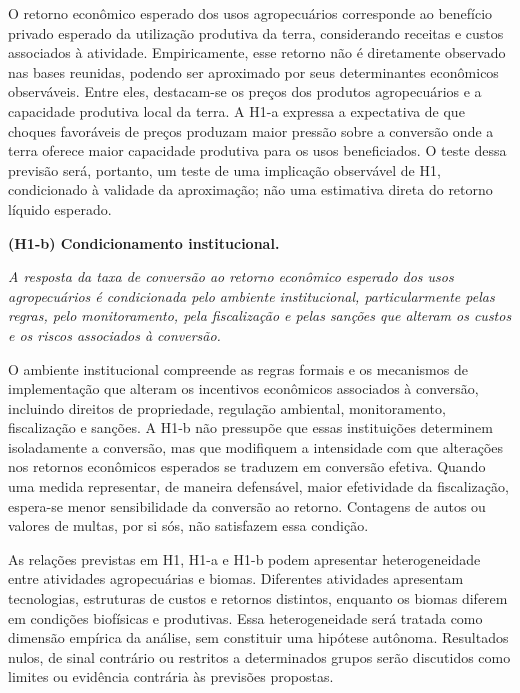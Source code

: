 O retorno econômico esperado dos usos agropecuários corresponde ao benefício privado esperado da utilização produtiva da terra, considerando receitas e custos associados à atividade. Empiricamente, esse retorno não é diretamente observado nas bases reunidas, podendo ser aproximado por seus determinantes econômicos observáveis. Entre eles, destacam-se os preços dos produtos agropecuários e a capacidade produtiva local da terra. A H1-a expressa a expectativa de que choques favoráveis de preços produzam maior pressão sobre a conversão onde a terra oferece maior capacidade produtiva para os usos beneficiados. O teste dessa previsão será, portanto, um teste de uma implicação observável de H1, condicionado à validade da aproximação; não uma estimativa direta do retorno líquido esperado.

\medskip
\noindent\textbf{(H1-b) Condicionamento institucional.}

\noindent\emph{A resposta da taxa de conversão ao retorno econômico esperado dos usos agropecuários é condicionada pelo ambiente institucional, particularmente pelas regras, pelo monitoramento, pela fiscalização e pelas sanções que alteram os custos e os riscos associados à conversão.}

O ambiente institucional compreende as regras formais e os mecanismos de implementação que alteram os incentivos econômicos associados à conversão, incluindo direitos de propriedade, regulação ambiental, monitoramento, fiscalização e sanções. A H1-b não pressupõe que essas instituições determinem isoladamente a conversão, mas que modifiquem a intensidade com que alterações nos retornos econômicos esperados se traduzem em conversão efetiva. Quando uma medida representar, de maneira defensável, maior efetividade da fiscalização, espera-se menor sensibilidade da conversão ao retorno. Contagens de autos ou valores de multas, por si sós, não satisfazem essa condição.

As relações previstas em H1, H1-a e H1-b podem apresentar heterogeneidade entre atividades agropecuárias e biomas. Diferentes atividades apresentam tecnologias, estruturas de custos e retornos distintos, enquanto os biomas diferem em condições biofísicas e produtivas. Essa heterogeneidade será tratada como dimensão empírica da análise, sem constituir uma hipótese autônoma. Resultados nulos, de sinal contrário ou restritos a determinados grupos serão discutidos como limites ou evidência contrária às previsões propostas.

